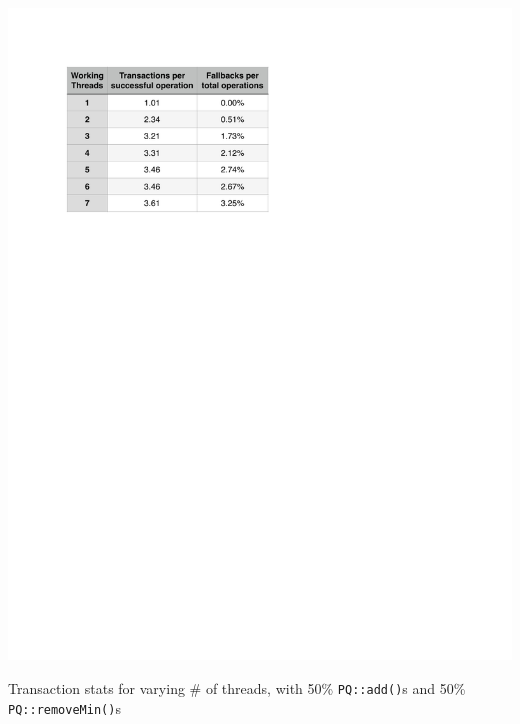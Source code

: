 \begin{table}[htb]
\centering
\begin{minipage}{.49\textwidth}
	\centering
  \includegraphics[width=\linewidth]{img/tsx-stat-threads.pdf}
\caption{Transaction stats for varying \# of threads, with 50\% \texttt{PQ::add()}s and 50\% \texttt{PQ::removeMin()}s}
\label{tbl:tsx-stat1}
\end{minipage}%
\hfill%
\begin{minipage}{.49\textwidth}
	\centering

\end{minipage}
\end{table}
